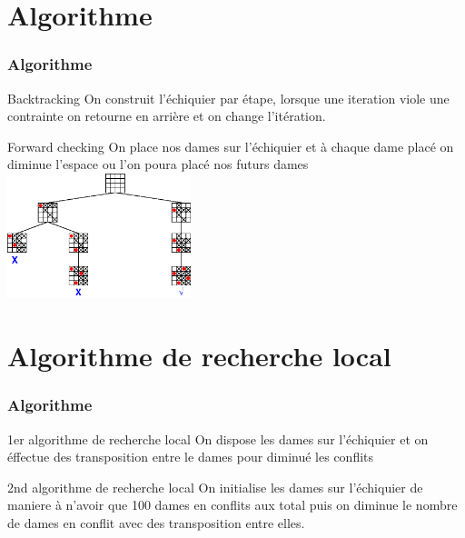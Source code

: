 \documentclass[10pt,a4paper]{beamer}
\begin{document}
\section{Algorithme}
\begin{frame}
	\frametitle{Algorithme}

	\begin{block}{Backtracking}
		On construit l'échiquier par étape, lorsque une iteration viole une contrainte on retourne en arrière et on change l'itération.
	\end{block}



	\begin{block}{Forward checking}
		On place nos dames sur l'échiquier et à chaque dame placé on diminue l'espace ou l'on poura placé nos futurs dames \\
		\includegraphics[width=0.4\textwidth]{images/forw.png}
	\end{block}

\end{frame}


\section{Algorithme de recherche local}
\begin{frame}
	\frametitle{Algorithme}

	\begin{block}{1er algorithme de recherche local}
		On dispose les dames sur l'échiquier et on éffectue des transposition entre le dames pour diminué les conflits
	\end{block}

	\begin{block}{2nd algorithme de recherche local}
		On initialise les dames sur l'échiquier de maniere à n'avoir que 100 dames en conflits aux total puis on diminue le nombre de dames en conflit avec des transposition entre elles.
	\end{block}


\end{frame}
\end{document}
